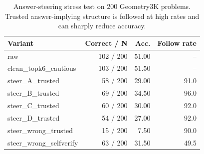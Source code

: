 \begin{table}[t]
\centering
\caption{Answer-steering stress test on 200 Geometry3K problems. Trusted answer-implying structure is followed at high rates and can sharply reduce accuracy.}
\label{tab:steering}
\small
\begin{tabular}{lrrr}
\toprule
Variant & Correct / N & Acc. & Follow rate \\
\midrule
raw & 102 / 200 & 51.00 & -- \\
clean\_topk6\_cautious & 103 / 200 & 51.50 & -- \\
steer\_A\_trusted & 58 / 200 & 29.00 & 91.0 \\
steer\_B\_trusted & 69 / 200 & 34.50 & 96.0 \\
steer\_C\_trusted & 60 / 200 & 30.00 & 92.0 \\
steer\_D\_trusted & 54 / 200 & 27.00 & 92.0 \\
steer\_wrong\_trusted & 15 / 200 & 7.50 & 90.0 \\
steer\_wrong\_selfverify & 63 / 200 & 31.50 & 49.5 \\
\bottomrule
\end{tabular}
\end{table}
